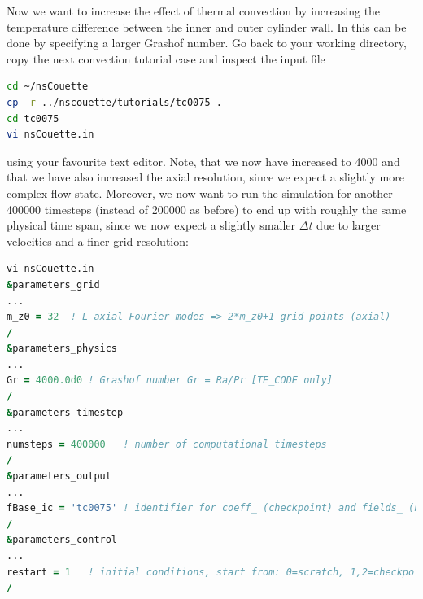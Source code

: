 \documentclass[a4paper, 11pt, DIV=11]{scrartcl}
\begin{document}
Now we want to increase the effect of thermal convection by increasing the
temperature difference between the inner and outer cylinder wall. In \nsc
this can be done by specifying a larger Grashof number. Go back to your working
directory, copy the next convection tutorial case and inspect the input file
\begin{lstlisting}[language=bash]
cd ~/nsCouette
cp -r ../nscouette/tutorials/tc0075 .
cd tc0075
vi nsCouette.in
\end{lstlisting}
using your favourite text editor. Note, that we now have increased \Gr to \num{4000}
and that we have also increased the axial resolution, since we expect a slightly more
complex flow state. Moreover, we now want to run the simulation for another
\num{400000} timesteps (instead of \num{200000} as before) to end up with roughly
the same physical time span, since we now expect a slightly smaller $\Delta t$ due to
larger velocities and a finer grid resolution:
\begin{lstlisting}[language=fortran]
vi nsCouette.in
&parameters_grid
...
m_z0 = 32  ! L axial Fourier modes => 2*m_z0+1 grid points (axial)
/
&parameters_physics
...
Gr = 4000.0d0 ! Grashof number Gr = Ra/Pr [TE_CODE only]
/
&parameters_timestep
...
numsteps = 400000   ! number of computational timesteps
/
&parameters_output
...
fBase_ic = 'tc0075' ! identifier for coeff_ (checkpoint) and fields_ (hdf5) files
/
&parameters_control
...
restart = 1   ! initial conditions, start from: 0=scratch, 1,2=checkpoint
/
\end{lstlisting}
\end{document}
